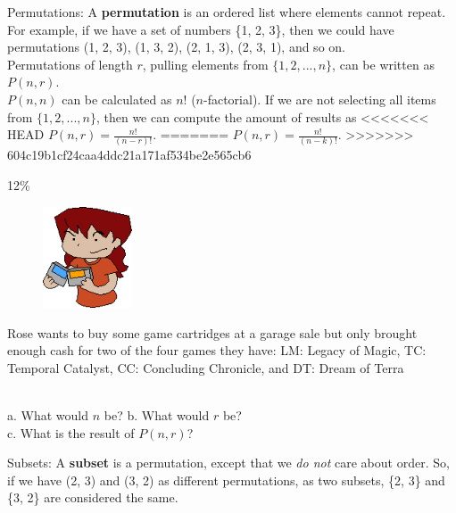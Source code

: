 \documentclass[a4paper,12pt]{book}
\begin{document}
        \begin{intro}{Permutations:}
            A \textbf{permutation} is an ordered list where elements cannot repeat.
            For example, if we have a set of numbers \{1, 2, 3\}, then
            we could have permutations (1, 2, 3), (1, 3, 2), (2, 1, 3), (2, 3, 1),
            and so on. ~\\

            Permutations of length $r$, pulling elements from
            $\{1, 2, ..., n\}$, can be written as $P(n,r)$. ~\\

            $P(n, n)$ can be calculated as $n!$ ($n$-factorial). If we are
            not selecting all items from $\{1, 2, ..., n\}$, then we can
            compute the amount of results as         
<<<<<<< HEAD
            $P(n, r) = \frac{n!}{(n-r)!}$.
=======
            $P(n, r) = \frac{n!}{(n-k)!}$.
>>>>>>> 604c19b1cf24caa4ddc21a171af534be2e565cb6
        \end{intro}

        \begin{question}{3}{12\%}

            \begin{figure}
                \includegraphics[height=3cm]{images/5-3-games.png}
            \end{figure}
        
            Rose wants to buy some game cartridges at a garage sale
            but only brought enough cash for two of the four games they have:
            LM: Legacy of Magic, TC: Temporal Catalyst, CC: Concluding Chronicle, and DT: Dream of Terra

            ~\\
            \tab a. What would $n$ be?
            \tab b. What would $r$ be? \\
            \tab c. What is the result of $P(n, r)$?
        \end{question}

    \begin{intro}{Subsets:}
        A \textbf{subset} is a permutation, except that we \textit{do not}
        care about order. So, if we have (2, 3) and (3, 2) as different
        permutations, as two subsets, \{2, 3\} and \{3, 2\} are considered
        the same.
    \end{intro}
\end{document}
